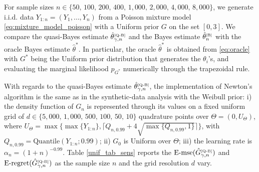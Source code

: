 \documentclass[twoside,12pt]{article}
\begin{document}
For sample sizes $n\in\{50,\,100,\,200,\,400,\,1,000,\,2,000,\,4,000,\,8,000\}$, we generate i.i.d. data $Y_{1:n}=(Y_{1},\ldots,Y_{n})$ from a Poisson mixture model \eqref{eq:mixture_model_poisson} with a Uniform prior $G$ on the set $[0,3]$. We compare the quasi-Bayes estimate $\hat{\theta}^{\text{\tiny{[Q-B]}}}_{\gamma,n}$ and the Bayes estimate $\hat{\theta}^{\text{\tiny{[B]}}}_{n}$ with the oracle Bayes estimate $\hat{\theta}^{\ast}$. In particular, the oracle $\hat{\theta}^{\ast}$ is obtained from \eqref{eq:oracle} with $G^{\ast}$ being the Uniform prior distribution that generates the $\theta_{i}$'s, and evaluating the marginal likelihood $p_{G^\ast}$ numerically through the trapezoidal rule.

With regards to the quasi-Bayes estimate $\hat{\theta}^{\text{\tiny{[Q-B]}}}_{\gamma,n}$,  the implementation of Newton's algorithm is the same as in the synthetic-data analysis with the Weibull prior: i) the density function of $G_{n}$ is represented through its values on a fixed uniform grid of $d\in\{5,000,\,1,000,\,500,\,100,\,50,\,10\}$ quadrature points over $\Theta=(0,U_{\Theta})$, where $U_\Theta=\max\{\max\{Y_{1:n}\},\lceil Q_{n,0.99}+4\sqrt{\max\{Q_{n,0.99},1\}}\rceil\}$, with $Q_{n,0.99}=\text{Quantile}(Y_{1:n};0.99)$; ii) $G_{0}$ is Uniform over $\Theta$; iii) the learning rate is $\alpha_{n}=(1+n)^{-0.99}$. Table \ref{unif_tab_sens} reports the $\mathrm{E\text{-}mse}(\hat{G}_{\gamma,n}^{\text{\tiny{[Q-B]}}})$ and $\mathrm{E\text{-}regret}(\hat{G}_{\gamma,n}^{\text{\tiny{[Q-B]}}})$ as the sample size $n$ and the grid resolution $d$ vary.
\end{document}
